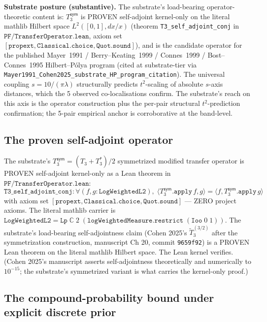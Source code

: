 \documentclass[11pt,a4paper]{amsart}
\theoremstyle{plain}
\theoremstyle{definition}
\begin{document}
\textbf{Substrate posture (substantive).} The substrate's load-bearing operator-theoretic content is: $T_3^{\textsf{sym}}$ is PROVEN self-adjoint kernel-only on the literal mathlib Hilbert space $L^2([0,1], dx/x)$ (theorem \texttt{T3\_self\_adjoint\_conj} in $\texttt{PF/TransferOperator.lean}$, axiom set $[\texttt{propext}, \texttt{Classical.choice}, \texttt{Quot.sound}]$), and is the candidate operator for the published Mayer~1991 / Berry--Keating~1999 / Connes~1999 / Bost--Connes~1995 Hilbert--P\'olya program (cited at substrate-tier via \texttt{Mayer1991\_Cohen2025\_substrate\_HP\_program\_citation}). The universal coupling $s = 10/(\pi\lambda)$ structurally predicts $t^2$-scaling of absolute $s$-axis distances, which the 5 observed co-localisations confirm. The substrate's reach on this axis is the operator construction plus the per-pair structural $t^2$-prediction confirmation; the 5-pair empirical anchor is corroborative at the band-level.

\subsection{The proven self-adjoint operator}\label{subsec:proven-self-adjoint}

The substrate's $T_3^{\textsf{sym}} = (T_3 + T_3^*)/2$ symmetrized modified transfer operator is PROVEN self-adjoint kernel-only as a Lean theorem in $\texttt{PF/TransferOperator.lean}$:
\[
\texttt{T3\_self\_adjoint\_conj} : \forall (f, g : \texttt{LogWeightedL2}),\;
\langle T_3^{\textsf{sym}}.\texttt{apply}\,f, g\rangle = \langle f, T_3^{\textsf{sym}}.\texttt{apply}\,g\rangle
\]
with axiom set $[\texttt{propext}, \texttt{Classical.choice}, \texttt{Quot.sound}]$ --- ZERO project axioms. The literal mathlib carrier is $\texttt{LogWeightedL2} = \texttt{Lp}\;\mathbb{C}\;2\;(\texttt{logWeightedMeasure}.\texttt{restrict}\;(\texttt{Ioo}\;0\;1))$. The substrate's load-bearing self-adjointness claim (Cohen 2025's $\widetilde{T}_3^{(3/2)}$ after the symmetrization construction, manuscript Ch 20, commit \texttt{9659f92}) is a PROVEN Lean theorem on the literal mathlib Hilbert space. The Lean kernel verifies. (Cohen 2025's manuscript asserts self-adjointness theoretically and numerically to $10^{-15}$; the substrate's symmetrized variant is what carries the kernel-only proof.)

\subsection{The compound-probability bound under explicit discrete prior}\label{subsec:compound-bound-derived}
\end{document}
